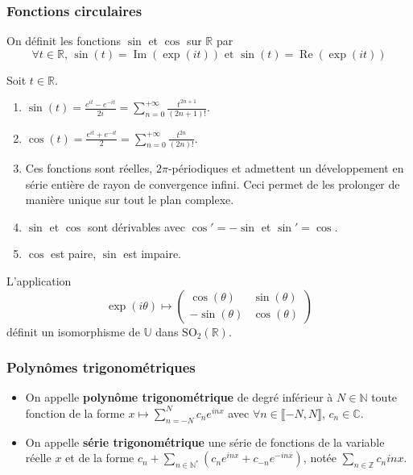 	\subsubsection{Fonctions circulaires}

	\begin{definition}
		On définit les fonctions $\sin$ et $\cos$ sur $\mathbb{R}$ par
		\[ \forall t \in \mathbb{R}, \, \sin(t) = \operatorname{Im}(\exp(it)) \text{ et } \sin(t) = \operatorname{Re}(\exp(it)) \]
	\end{definition}


	\begin{proposition}
		Soit $t \in \mathbb{R}$.
		\begin{enumerate}[label=(\roman*)]
			\item $\sin(t) = \frac{e^{it} - e^{-it}}{2i} = \sum_{n=0}^{+\infty} \frac{t^{2n+1}}{(2n+1)!}$.
			\item $\cos(t) = \frac{e^{it} + e^{-it}}{2} = \sum_{n=0}^{+\infty} \frac{t^{2n}}{(2n)!}$.
			\item Ces fonctions sont réelles, $2\pi$-périodiques et admettent un développement en série entière de rayon de convergence infini. Ceci permet de les prolonger de manière unique sur tout le plan complexe.
			\item $\sin$ et $\cos$ sont dérivables avec $\cos' = -\sin$ et $\sin' = \cos$.
			\item $\cos$ est paire, $\sin$ est impaire.
		\end{enumerate}
	\end{proposition}

	\reference[ROM21]{36}

	\begin{proposition}
		L'application
		\[ \exp(i\theta) \mapsto
		\begin{pmatrix}
			\cos(\theta) & \sin(\theta) \\
			-\sin(\theta) & \cos(\theta)
		\end{pmatrix}
		\]
		définit un isomorphisme de $\mathbb{U}$ dans $\mathrm{SO}_2(\mathbb{R})$.
	\end{proposition}

	\subsubsection{Polynômes trigonométriques}


	\begin{definition}
		\begin{itemize}
			\item On appelle \textbf{polynôme trigonométrique} de degré inférieur à $N \in \mathbb{N}$ toute fonction de la forme $x \mapsto \sum_{n=-N}^{N} c_n e^{inx}$ avec $\forall n \in \llbracket -N, N \rrbracket$, $c_n \in \mathbb{C}$.
			\item On appelle \textbf{série trigonométrique} une série de fonctions de la variable réelle $x$ et de la forme $c_n + \sum_{n \in \mathbb{N}^*} (c_n e^{inx} + c_{-n} e^{-inx})$, notée $\sum_{n \in \mathbb{Z}} c_n {inx}$.
		\end{itemize}
	\end{definition}

